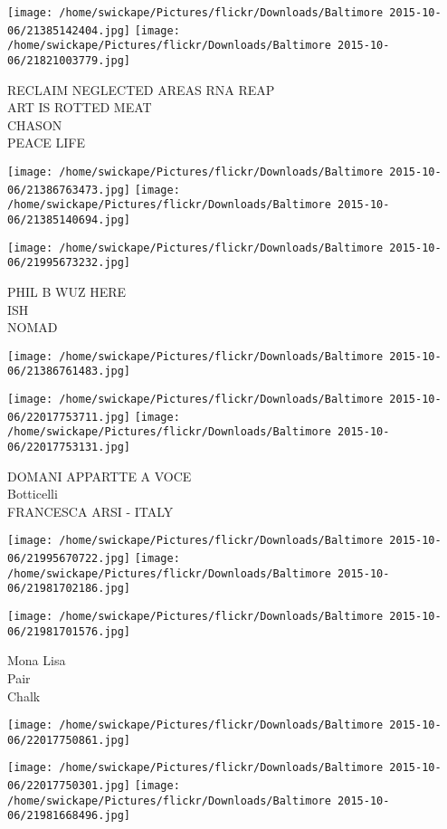 \documentclass[10pt,letterpaper]{article}
\begin{document}
\texttt{[image: /home/swickape/Pictures/flickr/Downloads/Baltimore 2015-10-06/21385142404.jpg]}
\texttt{[image: /home/swickape/Pictures/flickr/Downloads/Baltimore 2015-10-06/21821003779.jpg]}

RECLAIM NEGLECTED AREAS RNA REAP\\
ART IS ROTTED MEAT\\
CHASON\\
PEACE LIFE
\pagebreak

\texttt{[image: /home/swickape/Pictures/flickr/Downloads/Baltimore 2015-10-06/21386763473.jpg]}
\texttt{[image: /home/swickape/Pictures/flickr/Downloads/Baltimore 2015-10-06/21385140694.jpg]}

\texttt{[image: /home/swickape/Pictures/flickr/Downloads/Baltimore 2015-10-06/21995673232.jpg]}

PHIL B WUZ HERE\\
ISH\\
NOMAD
\pagebreak

\texttt{[image: /home/swickape/Pictures/flickr/Downloads/Baltimore 2015-10-06/21386761483.jpg]}

\vspace{0.25in}
\texttt{[image: /home/swickape/Pictures/flickr/Downloads/Baltimore 2015-10-06/22017753711.jpg]}
\texttt{[image: /home/swickape/Pictures/flickr/Downloads/Baltimore 2015-10-06/22017753131.jpg]}

DOMANI APPARTTE A VOCE\\
Botticelli\\
FRANCESCA ARSI {-} ITALY
\pagebreak

\texttt{[image: /home/swickape/Pictures/flickr/Downloads/Baltimore 2015-10-06/21995670722.jpg]}
\texttt{[image: /home/swickape/Pictures/flickr/Downloads/Baltimore 2015-10-06/21981702186.jpg]}

\texttt{[image: /home/swickape/Pictures/flickr/Downloads/Baltimore 2015-10-06/21981701576.jpg]}

Mona Lisa\\
Pair\\
Chalk
\pagebreak

\texttt{[image: /home/swickape/Pictures/flickr/Downloads/Baltimore 2015-10-06/22017750861.jpg]}

\vspace{0.25in}
\texttt{[image: /home/swickape/Pictures/flickr/Downloads/Baltimore 2015-10-06/22017750301.jpg]}
\texttt{[image: /home/swickape/Pictures/flickr/Downloads/Baltimore 2015-10-06/21981668496.jpg]}
\end{document}
